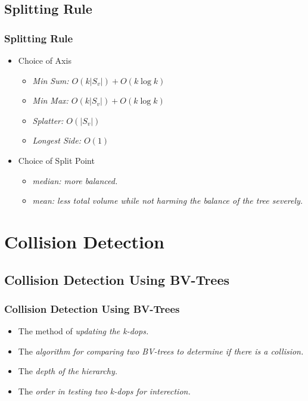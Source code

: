 \documentclass{beamer}
\begin{document}
\subsection{Splitting Rule}
	\begin{frame}
	\frametitle{Splitting Rule}
		\begin{itemize}
			\item Choice of Axis
			\begin{itemize}
				\item \it{Min Sum}: $O(k|S_{v}|)+O(k\log k)$
				\item \it{Min Max}: $O(k|S_{v}|)+O(k\log k)$
				\item \it{Splatter}: $O(|S_{v}|)$
				\item \it{Longest Side}: $O(1)$
			\end{itemize}
			\item Choice of Split Point
			\begin{itemize}
				\item \it{median}: more balanced.
				\item \it{mean}: less total volume while not harming the balance of the tree severely.
			\end{itemize}
		\end{itemize}
	\end{frame}

\section{Collision Detection}

\subsection{Collision Detection Using BV-Trees}
	\begin{frame}
	\frametitle{Collision Detection Using BV-Trees}
		\begin{itemize}
			\item The method of \it{updating} the k-dops.
			\item The \it{algorithm} for comparing two BV-trees to determine if there is a collision.
			\item The \it{depth} of the hierarchy.
			\item The \it{order} in testing two k-dops for interection.
		\end{itemize}
	\end{frame}
\end{document}
